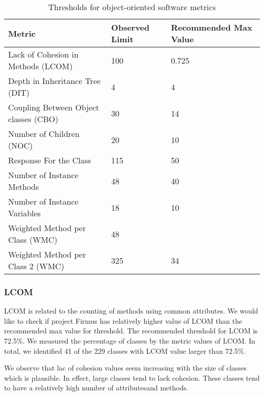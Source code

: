 \begin{table}[]
\centering
\caption{Thresholds for object-oriented software metrics}
\label{tab:thresholds}
\begin{tabular}{|l|l|l|}
\hline
\textbf{Metric}                       & \textbf{Observed Limit} & \textbf{Recommended Max Value} \\ \hline
Lack of Cohesion in Methods (LCOM)    & 100                     & 0.725\cite{tarcisio}                               \\ \hline
Depth in Inheritance Tree (DIT)       & 4                       & 4\cite{tarcisio}                              \\ \hline
Coupling Between Object classes (CBO) & 30                      & 14\cite{sahraoui2000can}                             \\ \hline
Number of Children (NOC)              & 20                      & 10                             \\ \hline
Response For the Class                & 115                     & 50\cite{rosenberg1999risk}                           \\ \hline
Number of Instance Methods            & 48                      & 40                             \\ \hline
Number of Instance Variables          & 18                      & 10                             \\ \hline
Weighted Method per Class (WMC)       & 48                      &                                \\ \hline
Weighted Method per Class 2 (WMC)     & 325                     & 34\cite{tarcisio}                             \\ \hline
\end{tabular}
\end{table}

\subsubsection{LCOM}
LCOM is related to the counting of methods using common attributes. We would like to check if project Firmus has relatively higher value of LCOM than the recommended max value for threshold. The recommended threshold for LCOM is 72.5\%. We measured the percentage of classes by the metric values of LCOM. In total, we identified 41 of the 229 classes with LCOM value larger than 72.5\%. 

We observe that lac of cohesion values seem increasing with the size of classes which is plausible. In effect, large classes tend to lack cohesion. These classes tend to have a relatively high number of attributesand methods.

